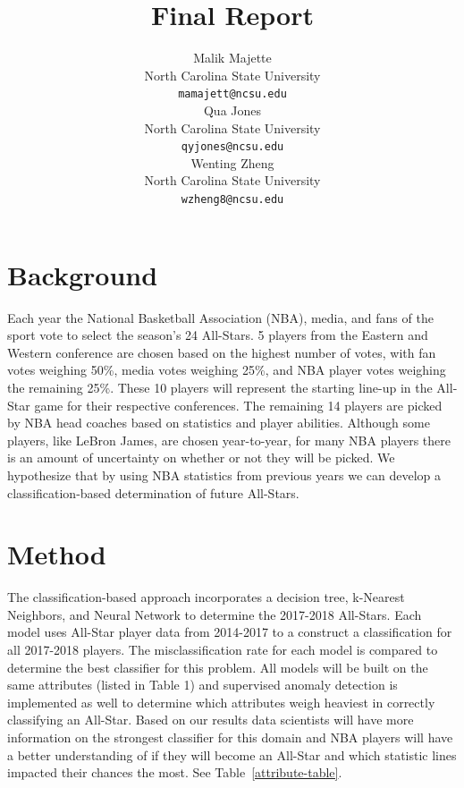 \documentclass{article}
\title{Final Report}
\author{
   Malik Majette \\
  North Carolina State University\\
   \texttt{mamajett@ncsu.edu} \\
   \And
   Qua Jones \\
  North Carolina State University\\
   \texttt{qyjones@ncsu.edu} \\
   \AND
   Wenting Zheng\\
  North Carolina State University\\
   \texttt{wzheng8@ncsu.edu} \\
}
\begin{document}
\maketitle


\section{Background}
Each year the National Basketball Association (NBA), media, and fans of the sport vote to select the season’s 24 All-Stars. 5 players from the Eastern and Western conference are chosen based on the highest number of votes, with fan votes weighing 50\%, media votes weighing 25\%, and NBA player votes weighing the remaining 25\%. These 10 players will represent the starting line-up in the All-Star game for their respective conferences. The remaining 14 players are picked by NBA head coaches based on statistics and player abilities. Although some players, like LeBron James, are chosen year-to-year, for many NBA players there is an amount of uncertainty on whether or not they will be picked. We hypothesize that by using NBA statistics from previous years we can develop a classification-based determination of future All-Stars.

\section{Method}

The classification-based approach incorporates a decision tree, k-Nearest Neighbors, and Neural Network to determine the 2017-2018 All-Stars. Each model uses All-Star player data from 2014-2017 to a construct a classification for all 2017-2018 players. The misclassification rate for each model is compared to determine the best classifier for this problem. All models will be built on the same attributes (listed in Table 1) and supervised anomaly detection is implemented as well to determine which attributes weigh heaviest in correctly classifying an All-Star. Based on our results data scientists will have more information on the strongest classifier for this domain and NBA players will have a better understanding of if they will become an All-Star and which statistic lines impacted their chances the most.
See
Table~\ref{attribute-table}.
\end{document}
